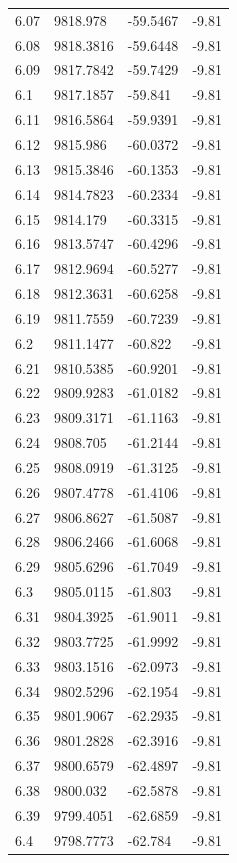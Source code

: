 \begin{table}[H]
\begin{tabular}{llll}
6.07 & 9818.978 & -59.5467 & -9.81 \\
6.08 & 9818.3816 & -59.6448 & -9.81 \\
6.09 & 9817.7842 & -59.7429 & -9.81 \\
6.1 & 9817.1857 & -59.841 & -9.81 \\
6.11 & 9816.5864 & -59.9391 & -9.81 \\
6.12 & 9815.986 & -60.0372 & -9.81 \\
6.13 & 9815.3846 & -60.1353 & -9.81 \\
6.14 & 9814.7823 & -60.2334 & -9.81 \\
6.15 & 9814.179 & -60.3315 & -9.81 \\
6.16 & 9813.5747 & -60.4296 & -9.81 \\
6.17 & 9812.9694 & -60.5277 & -9.81 \\
6.18 & 9812.3631 & -60.6258 & -9.81 \\
6.19 & 9811.7559 & -60.7239 & -9.81 \\
6.2 & 9811.1477 & -60.822 & -9.81 \\
6.21 & 9810.5385 & -60.9201 & -9.81 \\
6.22 & 9809.9283 & -61.0182 & -9.81 \\
6.23 & 9809.3171 & -61.1163 & -9.81 \\
6.24 & 9808.705 & -61.2144 & -9.81 \\
6.25 & 9808.0919 & -61.3125 & -9.81 \\
6.26 & 9807.4778 & -61.4106 & -9.81 \\
6.27 & 9806.8627 & -61.5087 & -9.81 \\
6.28 & 9806.2466 & -61.6068 & -9.81 \\
6.29 & 9805.6296 & -61.7049 & -9.81 \\
6.3 & 9805.0115 & -61.803 & -9.81 \\
6.31 & 9804.3925 & -61.9011 & -9.81 \\
6.32 & 9803.7725 & -61.9992 & -9.81 \\
6.33 & 9803.1516 & -62.0973 & -9.81 \\
6.34 & 9802.5296 & -62.1954 & -9.81 \\
6.35 & 9801.9067 & -62.2935 & -9.81 \\
6.36 & 9801.2828 & -62.3916 & -9.81 \\
6.37 & 9800.6579 & -62.4897 & -9.81 \\
6.38 & 9800.032 & -62.5878 & -9.81 \\
6.39 & 9799.4051 & -62.6859 & -9.81 \\
6.4 & 9798.7773 & -62.784 & -9.81 \\

\end{tabular}
\end{table}
